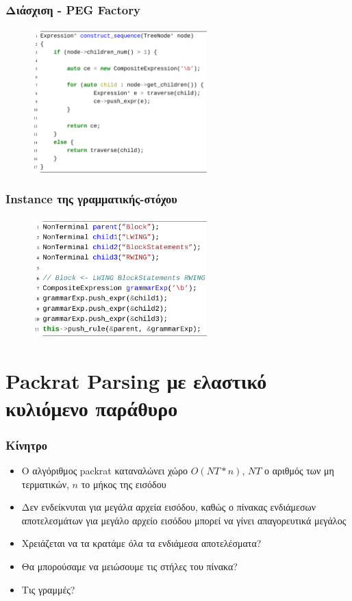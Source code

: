 \documentclass{beamer}
\begin{document}
\begin{frame}
  \frametitle{Διάσχιση - PEG Factory}
\begin{figure}[h]
    \centering
	\includegraphics[width=0.60\textwidth]{pics/traverse}
\end{figure} 
\end{frame}

\begin{frame}
  \frametitle{Instance της γραμματικής-στόχου}
\begin{figure}[h]
    \centering
	\includegraphics[width=0.60\textwidth]{pics/generated_instance}
\end{figure} 
\end{frame}

\section{Packrat Parsing με ελαστικό κυλιόμενο παράθυρο}

\begin{frame}
  \frametitle{Κίνητρο}
  \begin{itemize}
	\item O αλγόριθμος packrat καταναλώνει χώρο $O(NT * n)$, $NT$ ο αριθμός των μη τερματικών, $n$ το μήκος της εισόδου \pause
	\item Δεν ενδείκνυται για μεγάλα αρχεία εισόδου, καθώς ο πίνακας ενδιάμεσων αποτελεσμάτων για μεγάλο αρχείο εισόδου μπορεί να γίνει απαγορευτικά μεγάλος \pause
	\item Χρειάζεται να τα κρατάμε όλα τα ενδιάμεσα αποτελέσματα? \pause
	\item Θα μπορούσαμε να μειώσουμε τις στήλες του πίνακα? \pause
	\item Τις γραμμές?
	\end{itemize}
  \end{frame}
\end{document}
